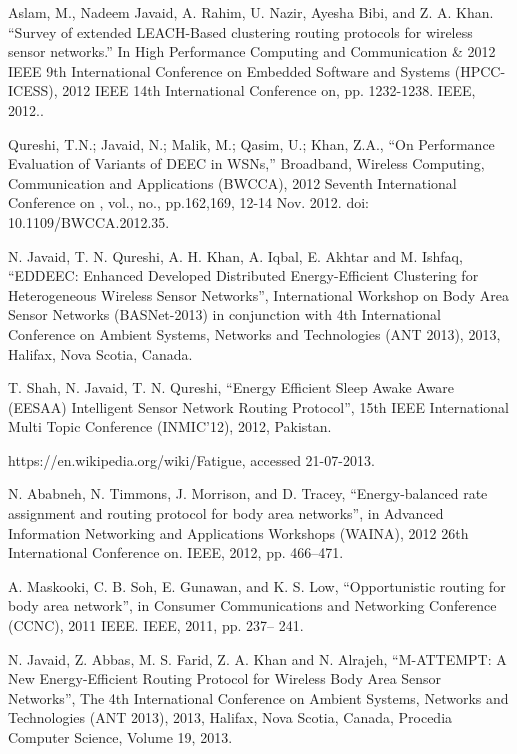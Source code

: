 \documentclass[journal]{IEEEtran}
\begin{document}
\begin{thebibliography}{1}
Aslam, M., Nadeem Javaid, A. Rahim, U. Nazir, Ayesha Bibi, and Z. A. Khan. ``Survey of extended LEACH-Based clustering routing protocols for wireless sensor networks.'' In High Performance Computing and Communication \& 2012 IEEE 9th International Conference on Embedded Software and Systems (HPCC-ICESS), 2012 IEEE 14th International Conference on, pp. 1232-1238. IEEE, 2012..

Qureshi, T.N.; Javaid, N.; Malik, M.; Qasim, U.; Khan, Z.A., ``On Performance Evaluation of Variants of DEEC in WSNs,'' Broadband, Wireless Computing, Communication and Applications (BWCCA), 2012 Seventh International Conference on , vol., no., pp.162,169, 12-14 Nov. 2012. doi: 10.1109/BWCCA.2012.35.

N. Javaid, T. N. Qureshi, A. H. Khan, A. Iqbal, E. Akhtar and M. Ishfaq, ``EDDEEC: Enhanced Developed
 Distributed Energy-Efficient Clustering for Heterogeneous Wireless Sensor Networks'', International
Workshop on Body Area Sensor Networks (BASNet-2013) in conjunction with 4th International Conference on
Ambient Systems, Networks and Technologies (ANT 2013), 2013, Halifax, Nova Scotia, Canada.

T. Shah, N. Javaid, T. N. Qureshi, ``Energy Efficient Sleep Awake Aware (EESAA) Intelligent Sensor Network Routing Protocol'', 15th IEEE International Multi Topic Conference (INMIC'12), 2012, Pakistan.

https://en.wikipedia.org/wiki/Fatigue, accessed 21-07-2013.

N. Ababneh, N. Timmons, J. Morrison, and D. Tracey, ``Energy-balanced
rate assignment and routing protocol for body area networks'', in Advanced Information Networking and Applications Workshops (WAINA),
2012 26th International Conference on. IEEE, 2012, pp. 466–471.

A. Maskooki, C. B. Soh, E. Gunawan, and K. S. Low, ``Opportunistic
routing for body area network'', in Consumer Communications and
Networking Conference (CCNC), 2011 IEEE. IEEE, 2011, pp. 237–
241.

N. Javaid, Z. Abbas, M. S. Farid, Z. A. Khan and N. Alrajeh, ``M-ATTEMPT: A New Energy-Efficient Routing Protocol for Wireless Body Area Sensor Networks'', The 4th International Conference on Ambient Systems, Networks and Technologies (ANT 2013), 2013, Halifax, Nova Scotia, Canada, Procedia Computer Science, Volume 19, 2013.


\end{thebibliography}
\end{document}
